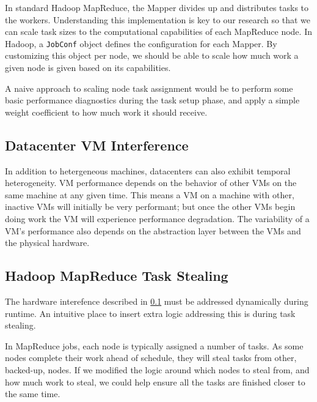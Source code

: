 In standard Hadoop MapReduce, the Mapper divides up and distributes tasks to the workers.
Understanding this implementation is key to our research so that we can scale task sizes
to the computational capabilities of each MapReduce node. In Hadoop, a \texttt{JobConf}
object defines the configuration for each Mapper. By customizing this object per node,
we should be able to scale how much work a given node is given based on its capabilities.

A naive approach to scaling node task assignment would be to perform some basic performance
diagnostics during the task setup phase, and apply a simple weight coefficient to how much
work it should receive.

\subsection{Datacenter VM Interference}
\label{sec:interference}
In addition to hetergeneous machines, datacenters can also exhibit temporal heterogeneity.
VM performance depends on the behavior of other VMs on the same machine at any given time.
This means a VM on a machine with other, inactive VMs will initially be very performant;
but once the other VMs begin doing work the VM will experience performance degradation.
The variability of a VM's performance also depends on the abstraction layer between the VMs
and the physical hardware.

\subsection{Hadoop MapReduce Task Stealing}
The hardware interefence described in \ref{sec:interference} must be addressed dynamically
during runtime. An intuitive place to insert extra logic addressing this is during task
stealing.

In MapReduce jobs, each node is typically assigned a number of tasks. As some nodes 
complete their work ahead of schedule, they will steal tasks from other, backed-up,
nodes. If we modified the logic around which nodes to steal from, and how much work
to steal, we could help ensure all the tasks are finished closer to the same time.

